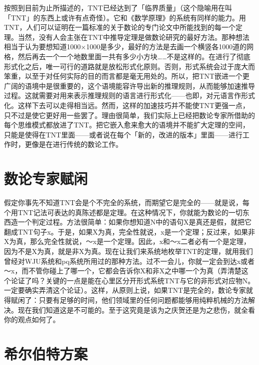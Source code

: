 \documentclass[
  12pt,
  twoside,
  openright,
  oldfontcommands,
]{memoir}
\begin{document}
按照到目前为止所描述的，TNT已经达到了「临界质量」（这个隐喻用在叫「TNT」的东西上或许有点奇怪）。它和《数学原理》的系统有同样的能力。用TNT，人们可以证明在一篇标准的关于数论的专门论文中所能找到的每一个定理。当然，没有人会主张在TNT中推导定理是做数论研究的最好方法。那种想法相当于认为要想知道1000×1000是多少，最好的方法是去画一个横竖各1000道的网格，然后再去一个一个地数里面一共有多少小方块\ldots\ldots 不是这样的。在进行了彻底形式化之后，唯一可行的道路就是放松形式化原则。否则，形式系统会过于庞大而笨重，以至于对任何实际的目的而言都是毫无用处的。所以，把TNT嵌进一个更广阔的语境中是很重要的，这个语境能容许导出新的推理规则，从而能够加速推导过程。这就需要对用来表示推理规则的语言进行形式化------也即，对元语言作形式化。这样下去可以走得相当远。然而，这样的加速技巧并不能使TNT更强一点，只不过是使它更好用一些罢了。理由很简单，我们实际上已经把数论专家所借助的每个思维模式都放进了TNT。把它嵌入愈来愈大的语境并不能扩大定理的空间，只能是使得在TNT里面------或者说在每个「新的，改进的版本」里面------进行工作时，更像是在进行传统的数论工作。

\section{数论专家赋闲}

假定你事先不知道TNT会是个不完全的系统，而期望它是完全的------就是说，每个用TNT记法可表达的真陈述都是定理。在这种情况下，你就能为数论的一切东西造一个判定过程。方法很简单：如果你想知道N中的语句X是真还是假，就把它翻成TNT句子x。于是，如果X为真，完全性就说，x是一个定理；反过来，如果非X为真，那么完全性就说，～x是一个定理。因此，x和～x二者必有一个是定理，因为不是X为真，就是非X为真。现在让我们来系统地枚举TNT的定理，就用我们曾经对WJU系统和pq系统所用过的那种方法。过不一会儿，你就一定会到达x或者～x，而不管你碰上了哪一个，它都会告诉你X和非X之中哪一个为真（弄清楚这个论证了吗？关键的一点是能在心里区分开形式系统TNT与它的非形式对应物N。一定要确实弄清这个论证）。这样，从原则上说，如果TNT是完全的，数论专家就得赋闲了：只要有足够的时间，他们领域里的任何问题都能够用纯粹机械的方法解决。现在我们知道这是不可能的。至于这究竟是该为之庆贺还是为之悲伤，就全看你的观点如何了。

\section{希尔伯特方案}
\end{document}
